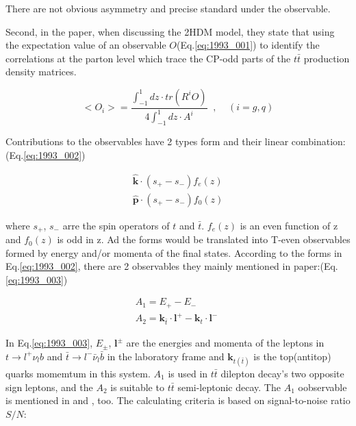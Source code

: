 			There are not obvious asymmetry and precise standard under the observable.

			Second, in the paper\cite{Bernreuther:1993hq}, when discussing the 2HDM model, they state that using the expectation value of an observable $O$(Eq.\ref{eq:1993_001}) to identify the correlations at the parton level which trace the CP-odd parts of the $t\bar{t}$ production density matrices.
			
			\begin{equation}
			<O_i> = \frac{\int_{-1}^{1}dz\cdot tr(R^iO)}{4\int_{-1}^{1}dz\cdot A^i}\;\;,\;\;\;\;(i=g,q) 
			\label{eq:1993_001}
			\end{equation}

			Contributions to the observables have 2 types form and their linear combination:(Eq.\ref{eq:1993_002})

			\begin{equation}
			\begin{split} 
			\hat{\textbf{k}} \cdot (s_+ - s_-) f_e(z) \\
			\hat{\textbf{p}} \cdot (s_+ - s_-) f_0(z)
			\end{split}
			\label{eq:1993_002}
			\end{equation}

			where $s_+$, $s_-$ arre the spin operators of $t$ and $\bar{t}$. $f_e(z)$ is an even function of z and $f_0(z)$ is odd in z. Ad the forms would be translated into T-even observables formed by energy and/or momenta of the final states. According to the forms in Eq.\ref{eq:1993_002}, there are 2 observables they mainly mentioned in paper\cite{Bernreuther:1993hq}:(Eq.\ref{eq:1993_003})

			\begin{equation}
			\begin{split} 
			A_1 = E_+ - E_- \;\;\;\;\;\;\;\;\;\\
			A_2 = \textbf{k}_{\bar{t}} \cdot \textbf{l}^+ - \textbf{k}_t \cdot \textbf{l}^-
			\end{split}
			\label{eq:1993_003}
			\end{equation}

			In Eq.\ref{eq:1993_003}, $E_{\pm}$, $\textbf{l}^{\pm}$ are the energies and momenta of the leptons in $t \rightarrow l^+ \nu_l b$ and $\bar{t} \rightarrow l^- \bar{\nu}_l \bar{b}$ in the laboratory frame and $\textbf{k}_{t(\bar{t})}$ is the top(antitop) quarks momemtum in this system. $A_1$ is used in $t\bar{t}$ dilepton decay's two opposite sign leptons, and the $A_2$ is suitable to $t\bar{t}$ semi-leptonic decay. The $A_1$ oobservable is mentioned in \cite{Choi:1997ie} and \cite{Zhou:1998wz}, too. The calculating criteria is based on signal-to-noise ratio $S/N$:

